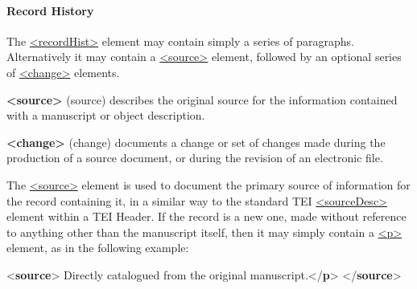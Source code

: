 \paragraph[{Record History}]{Record History}\label{msrh}\par
The \hyperref[TEI.recordHist]{<recordHist>} element may contain simply a series of paragraphs. Alternatively it may contain a \hyperref[TEI.source]{<source>} element, followed by an optional series of \hyperref[TEI.change]{<change>} elements. 
\begin{sansreflist}
  
\item [\textbf{<source>}] (source) describes the original source for the information contained with a manuscript or object description.
\item [\textbf{<change>}] (change) documents a change or set of changes made during the production of a source document, or during the revision of an electronic file.
\end{sansreflist}
\par
The \hyperref[TEI.source]{<source>} element is used to document the primary source of information for the record containing it, in a similar way to the standard TEI \hyperref[TEI.sourceDesc]{<sourceDesc>} element within a TEI Header. If the record is a new one, made without reference to anything other than the manuscript itself, then it may simply contain a \hyperref[TEI.p]{<p>} element, as in the following example: \par\bgroup{}\exampleFont \begin{shaded}\noindent\mbox{}{<\textbf{source}>}\mbox{}\newline 
{}Directly catalogued from the original manuscript.{</\textbf{p}>}\mbox{}\newline 
{</\textbf{source}>}\end{shaded}\egroup\par \par
